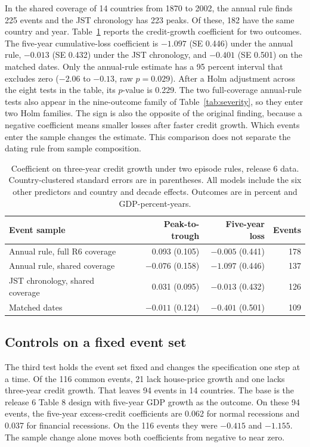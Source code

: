 \documentclass[11pt]{article}
\begin{document}
In the shared coverage of 14 countries from 1870 to 2002, the annual rule finds 225 events
and the JST chronology has 223 peaks. Of these, 182 have the same country and year.
Table~\ref{tab:rules} reports the credit-growth coefficient for two outcomes. The five-year
cumulative-loss coefficient is $-1.097$ (SE 0.446) under the annual rule, $-0.013$ (SE 0.432)
under the JST chronology, and $-0.401$ (SE 0.501) on the matched dates. Only the annual-rule
estimate has a 95 percent interval that excludes zero ($-2.06$ to $-0.13$, raw $p=0.029$).
After a Holm adjustment across the eight tests in the table, its $p$-value is 0.229. The
two full-coverage annual-rule tests also appear in the nine-outcome family of
Table~\ref{tab:severity}, so they enter two Holm families. The
sign is also the opposite of the original finding, because a negative coefficient means
smaller losses after faster credit growth. Which events enter the sample changes the
estimate. This comparison does not separate the dating rule from sample composition.

\begin{table}[htbp]
\centering
\small
\caption{Coefficient on three-year credit growth under two episode rules, release 6 data.
Country-clustered standard errors are in parentheses. All models include the six other
predictors and country and decade effects. Outcomes are in percent and GDP-percent-years.}
\label{tab:rules}
\begin{tabular}{lrrr}
\toprule
Event sample & Peak-to-trough & Five-year loss & Events \\
\midrule
Annual rule, full R6 coverage & 0.093 (0.105) & $-0.005$ (0.441) & 178 \\
Annual rule, shared coverage & $-0.076$ (0.158) & $-1.097$ (0.446) & 137 \\
JST chronology, shared coverage & 0.031 (0.095) & $-0.013$ (0.432) & 126 \\
Matched dates & $-0.011$ (0.124) & $-0.401$ (0.501) & 109 \\
\bottomrule
\end{tabular}
\end{table}

\subsection{Controls on a fixed event set}
The third test holds the event set fixed and changes the specification one step at a time.
Of the 116 common events, 21 lack house-price growth and one lacks three-year credit growth.
That leaves 94 events in 14 countries. The base is the release 6 Table 8 design with
five-year GDP growth as the outcome. On these 94 events, the five-year excess-credit
coefficients are 0.062 for normal recessions and 0.037 for financial recessions. On the 116
events they were $-0.415$ and $-1.155$. The sample change alone moves both coefficients from
negative to near zero.
\end{document}
